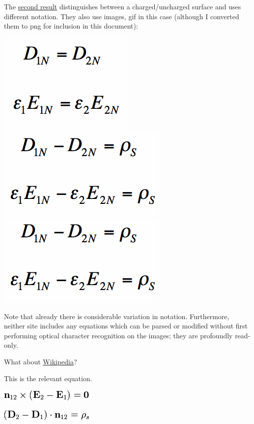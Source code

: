 \documentclass[12pt,letterpaper]{article}
\begin{document}
The
\href{http://www.antenna-theory.com/tutorial/electromagnetics/electric-field-boundary-conditions.php}
{second result} distinguishes between a charged/uncharged surface and uses different notation.
They also use images,
gif in this case
(although I converted them to png for inclusion in this document):
\begin{center}
\includegraphics[scale=0.3]{normalDequal.png}
\includegraphics[scale=0.3]{normalEfieldWithCharge.png}
\includegraphics[scale=0.3]{normalEfieldWithCharge.png}
\end{center}

Note that already there is considerable variation in notation.
Furthermore, neither site includes any equations which can be parsed or modified
without first performing optical character recognition on the images;
they are profoundly read-only.

What about
\href{https://en.wikipedia.org/wiki/Interface_conditions_for_electromagnetic_fields}
{Wikipedia}?

This is the relevant equation.

\begin{center}
\includegraphics[scale=0.5]{wikipedia1.png}

\includegraphics[scale=0.5]{wikipedia2.png}
\end{center}
\end{document}

